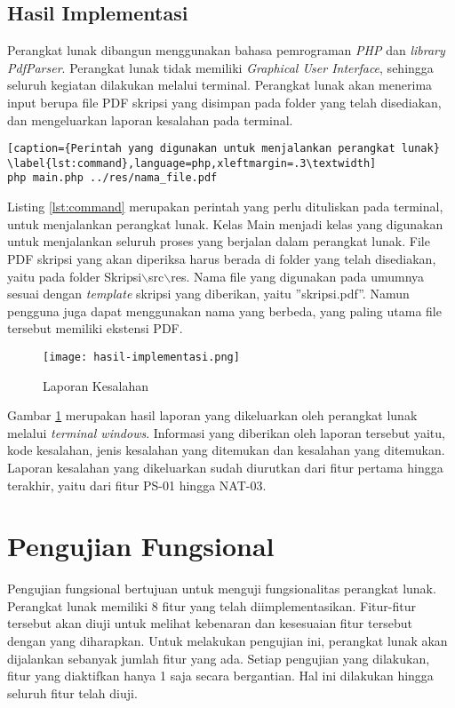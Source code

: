 \subsection{Hasil Implementasi}
Perangkat lunak dibangun menggunakan bahasa pemrograman \textit{PHP} dan \textit{library PdfParser}. Perangkat lunak tidak memiliki \textit{Graphical User Interface}, sehingga seluruh kegiatan dilakukan melalui terminal. Perangkat lunak akan menerima input berupa file PDF skripsi yang disimpan pada folder yang telah disediakan, dan mengeluarkan laporan kesalahan pada terminal.

\begin{lstlisting}[caption={Perintah yang digunakan untuk menjalankan perangkat lunak}	\label{lst:command},language=php,xleftmargin=.3\textwidth] 
php main.php ../res/nama_file.pdf
\end{lstlisting}
\medskip

Listing \ref{lst:command} merupakan perintah yang perlu dituliskan pada terminal, untuk menjalankan perangkat lunak. Kelas Main menjadi kelas yang digunakan untuk menjalankan seluruh proses yang berjalan dalam perangkat lunak. File PDF skripsi yang akan diperiksa harus berada di folder yang telah disediakan, yaitu pada folder Skripsi$\backslash$src$\backslash$res. Nama file yang digunakan pada umumnya sesuai dengan \textit{template} skripsi yang diberikan, yaitu ''skripsi.pdf''. Namun pengguna juga dapat menggunakan nama yang berbeda, yang paling utama file tersebut memiliki ekstensi PDF.

\begin{figure}[H]
	\centering	
	\texttt{[image: hasil-implementasi.png]}
	\caption{Laporan Kesalahan}	
	\label{fig:error_report} 
\end{figure}
\medskip

Gambar \ref{fig:error_report} merupakan hasil laporan yang dikeluarkan oleh perangkat lunak melalui \textit{terminal windows}. Informasi yang diberikan oleh laporan tersebut yaitu, kode kesalahan, jenis kesalahan yang ditemukan dan kesalahan yang ditemukan. Laporan kesalahan yang dikeluarkan sudah diurutkan dari fitur pertama hingga terakhir, yaitu dari fitur PS-01 hingga NAT-03.

\section{Pengujian Fungsional}
Pengujian fungsional bertujuan untuk menguji fungsionalitas perangkat lunak. Perangkat lunak memiliki 8 fitur yang telah diimplementasikan. Fitur-fitur tersebut akan diuji untuk melihat kebenaran dan kesesuaian fitur tersebut dengan yang diharapkan. Untuk melakukan pengujian ini, perangkat lunak akan dijalankan sebanyak jumlah fitur yang ada. Setiap pengujian yang dilakukan, fitur yang diaktifkan hanya 1 saja secara bergantian. Hal ini dilakukan hingga seluruh fitur telah diuji.

